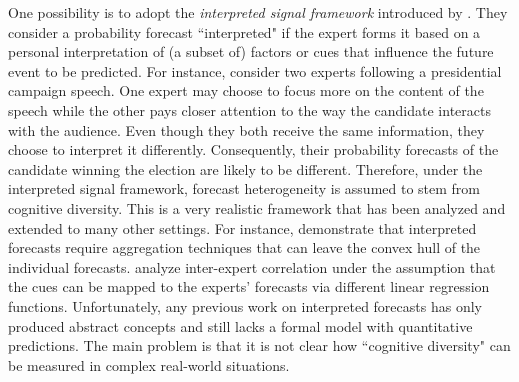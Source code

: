 \documentclass[11pt]{article}
\theoremstyle{definition}
\theoremstyle{definition}
\begin{document}
One possibility is to adopt the \textit{interpreted signal framework} introduced by \cite{hong2009interpreted}. They consider a probability forecast ``interpreted" if the expert forms it based on a personal interpretation of (a subset of) factors or cues that influence the future event to be predicted. For instance, consider two experts following a presidential campaign speech. One expert may choose to focus more on the content of the speech while the other pays closer attention to the way the candidate interacts with the audience.  Even though they both receive the same information, they choose to interpret it differently. Consequently, their probability forecasts of the candidate winning the election are likely to be different. Therefore, under the interpreted signal framework, forecast heterogeneity is assumed to stem from cognitive diversity. This is a very realistic framework that has been analyzed and extended to many other settings. For instance, \cite{parunak2013characterizing} demonstrate that interpreted forecasts require aggregation techniques that can leave the convex hull of the individual forecasts. \cite{broomell2009experts} analyze inter-expert correlation under the assumption that the cues can be mapped to the experts' forecasts via different linear regression functions. Unfortunately, any previous work on interpreted forecasts has only produced abstract concepts and still lacks a formal model with quantitative predictions. The main problem is that it is not clear how ``cognitive diversity" can be measured in complex real-world situations.
 
\end{document}

